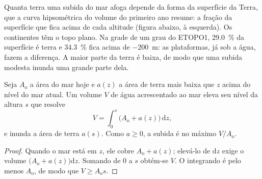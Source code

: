 Quanta terra uma subida do mar afoga depende da forma da superfície da Terra, que a
curva hipsométrica do volume do primeiro ano resume: a fração da superfície que fica acima de
cada altitude (figura abaixo, à esquerda). Os continentes têm o topo plano. Na grade de um grau do
ETOPO1, \qty{29.0}{\percent} da superfície é terra e \qty{34.3}{\percent} fica acima de
\qty{-200}{m}: as plataformas, já sob a água, fazem a diferença. A maior parte da terra é baixa, de modo que uma
subida modesta inunda uma grande parte dela.

\begin{proposition}\label{prop:b2:phanerozoic-earth:flooding}
Seja $A_{\text{o}}$ a área do mar hoje e $a(z)$ a área de terra mais baixa que $z$ acima
do nível do mar atual. Um volume $V$ de água acrescentado ao mar eleva seu nível da altura $s$
que resolve
\[
V = \int_0^s \bigl(A_{\text{o}} + a(z)\bigr)\,\mathrm{d}z ,
\]
e inunda a área de terra $a(s)$. Como $a \ge 0$, a subida é no máximo $V/A_{\text{o}}$.
\end{proposition}

\begin{proof}
Quando o mar está em $z$, ele cobre $A_{\text{o}} + a(z)$; elevá-lo de $\mathrm{d}z$ exige
o volume $\bigl(A_{\text{o}} + a(z)\bigr)\mathrm{d}z$. Somando de 0 a $s$ obtém-se $V$. O
integrando é pelo menos $A_{\text{o}}$, de modo que $V \ge A_{\text{o}}s$.
\end{proof}

